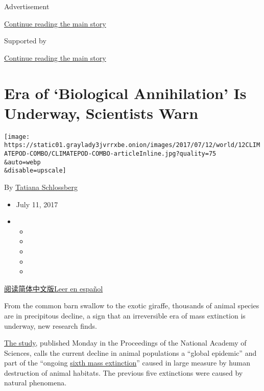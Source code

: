 Advertisement

\protect\hyperlink{after-top}{Continue reading the main story}

Supported by

\protect\hyperlink{after-sponsor}{Continue reading the main story}

\hypertarget{era-of-biological-annihilation-is-underway-scientists-warn}{%
\section{Era of `Biological Annihilation' Is Underway, Scientists
Warn}\label{era-of-biological-annihilation-is-underway-scientists-warn}}

\texttt{[image: https://static01.graylady3jvrrxbe.onion/images/2017/07/12/world/12CLIMATEPOD-COMBO/CLIMATEPOD-COMBO-articleInline.jpg?quality=75\\\&auto=webp\\\&disable=upscale]}

By
\href{https://www.nytimes3xbfgragh.onion/by/tatiana-schlossberg}{Tatiana
Schlossberg}

\begin{itemize}
\item
  July 11, 2017
\item
  \begin{itemize}
  \item
  \item
  \item
  \item
  \item
  \end{itemize}
\end{itemize}

\href{https://cn.nytstyle.com/science/20170712/mass-extinction-animal-species}{阅读简体中文版}\href{https://www.nytimes3xbfgragh.onion/es/2017/07/14/aniquilacion-biologica-extincion-especies}{Leer
en español}

From the common barn swallow to the exotic giraffe, thousands of animal
species are in precipitous decline, a sign that an irreversible era of
mass extinction is underway, new research finds.

\href{http://m.pnas.org/content/early/2017/07/05/1704949114.full.pdf}{The
study}, published Monday in the Proceedings of the National Academy of
Sciences, calls the current decline in animal populations a ``global
epidemic'' and part of the ``ongoing
\href{http://www.newyorker.com/magazine/2009/05/25/the-sixth-extinction}{sixth
mass extinction}'' caused in large measure by human destruction of
animal habitats. The previous five extinctions were caused by natural
phenomena.

